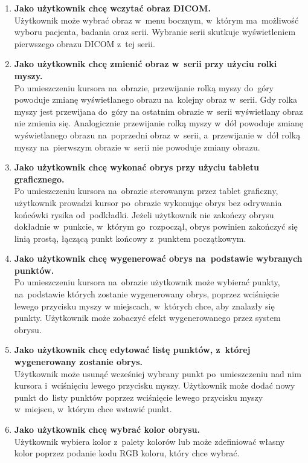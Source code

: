 \documentclass[a4paper,11pt,twoside,openright]{report}
\theoremstyle{definition}
\begin{document}
\begin{enumerate}
\item \textbf {Jako użytkownik chcę wczytać obraz DICOM.} \\
Użytkownik może wybrać obraz w~menu bocznym, w~którym ma~możliwość wyboru pacjenta,
badania oraz serii. Wybranie serii skutkuje wyświetleniem pierwszego obrazu DICOM z~tej serii.

\item \textbf {Jako użytkownik chcę zmienić obraz w~serii przy użyciu rolki myszy.} \\
Po umieszczeniu kursora na~obrazie, przewijanie rolką myszy do~góry powoduje zmianę
wyświetlanego obrazu na~kolejny obraz w~serii. Gdy rolka myszy jest przewijana do~góry
na ostatnim obrazie w~serii wyświetlany obraz nie zmienia się. Analogicznie
przewijanie rolką myszy w~dół powoduje zmianę wyświetlanego obrazu na~poprzedni
obraz w~serii, a~przewijanie w~dół rolką myszy na~pierwszym obrazie w~serii nie
powoduje zmiany obrazu.

\item \textbf {Jako użytkownik chcę wykonać obrys przy użyciu tabletu graficznego.} \\
Po umieszczeniu kursora na~obrazie sterowanym przez tablet graficzny, użytkownik
prowadzi kursor po~obrazie wykonując obrys bez odrywania końcówki rysika od~podkładki.
Jeżeli użytkownik nie zakończy obrysu dokładnie w~punkcie, w~którym go~rozpoczął,
obrys powinien zakończyć się linią prostą, łączącą punkt końcowy z~punktem początkowym.

\item \textbf {Jako użytkownik chcę wygenerować obrys na~podstawie wybranych punktów.} \\
Po umieszczeniu kursora na~obrazie użytkownik może wybierać punkty, na~podstawie
których zostanie wygenerowany obrys, poprzez wciśnięcie lewego przycisku myszy w
miejscach, w~których chce, aby znalazły się punkty. Użytkownik może zobaczyć efekt
wygenerowanego przez system obrysu.

\item \textbf {Jako użytkownik chcę edytować listę punktów, z~której wygenerowany zostanie obrys.} \\
Użytkownik może usunąć wcześniej wybrany punkt po~umieszczeniu nad nim kursora i~wciśnięciu
lewego przycisku myszy. Użytkownik może dodać nowy punkt do~listy punktów
poprzez wciśnięcie lewego przycisku myszy w~miejscu, w~którym chce wstawić punkt.

\item \textbf {Jako użytkownik chcę wybrać kolor obrysu.} \\
Użytkownik wybiera kolor z~palety kolorów lub może zdefiniować własny kolor poprzez
podanie kodu RGB koloru, który chce wybrać.


\end{enumerate}
\end{document}
